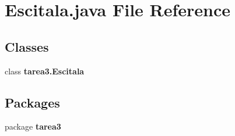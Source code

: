 \section{Escitala.\+java File Reference}
\label{_escitala_8java}
\subsection*{Classes}
\begin{DoxyCompactItemize}
\item 
class {\bf tarea3.\+Escitala}
\end{DoxyCompactItemize}
\subsection*{Packages}
\begin{DoxyCompactItemize}
\item 
package {\bf tarea3}
\end{DoxyCompactItemize}
